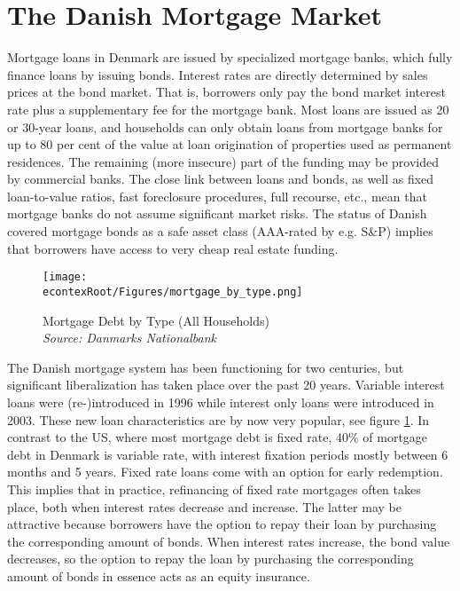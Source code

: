 \documentclass[titlepage]{\econtex}\newcommand{\texname}{ConsumptionHeterogeneity}
\begin{document}
\section{The Danish Mortgage Market} \label{mortgage_market}
\setcounter{figure}{0}   
\setcounter{table}{0} 
Mortgage loans in Denmark are issued by specialized mortgage banks, which fully finance loans by issuing bonds. Interest rates are directly determined by sales prices at the bond market. That is, borrowers only pay the bond market interest rate plus a supplementary fee for the mortgage bank. 
Most loans are issued as 20 or 30-year loans, and households can only obtain loans from mortgage banks for up to 80 per cent of the value at loan origination of properties used as permanent residences. The remaining (more insecure) part of the funding may be provided by commercial banks. The close link between loans and bonds, as well as fixed loan-to-value ratios, fast foreclosure procedures, full recourse, etc., mean that mortgage banks do not assume significant market risks. The status of Danish covered mortgage bonds as a safe asset class (AAA-rated by e.g. S\&P) implies that borrowers have access to very cheap real estate funding.

\begin{figure} 
	\begin{centering}
		\texttt{[image: \\econtexRoot/Figures/mortgage\_by\_type.png]} 
		\caption{Mortgage Debt by Type (All Households)
		{\\ \emph{\footnotesize
	{Source: Danmarks Nationalbank}}
	}}
		\label{fig:mortgage_by_type}
	\end{centering}
\end{figure}

The Danish mortgage system has been functioning for two centuries, but significant liberalization has taken place over the past 20 years. Variable interest loans were (re-)introduced in 1996 while interest only loans were introduced in 2003. These new loan characteristics are by now very popular, see figure \ref{fig:mortgage_by_type}. In contrast to the US, where most mortgage debt is fixed rate, 40\% of mortgage debt in Denmark is variable rate, with interest fixation periods mostly between 6 months and 5 years. Fixed rate loans come with an option for early redemption. This implies that in practice, refinancing of fixed rate mortgages often takes place, both when interest rates decrease and increase. The latter may be attractive because borrowers have the option to repay their loan by purchasing the corresponding amount of bonds. When interest rates increase, the bond value decreases, so the option to repay the loan by purchasing the corresponding amount of bonds in essence acts as an equity insurance.  
\end{document}

